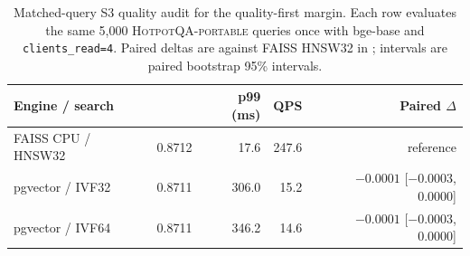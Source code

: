 \begin{table}[t]
\centering
\small
\setlength{\tabcolsep}{5pt}
\caption{Matched-query S3 quality audit for the quality-first margin. Each row evaluates the same 5{,}000 \textsc{HotpotQA-portable} queries once with bge-base and \texttt{clients\_read=4}. Paired deltas are against FAISS HNSW32 in \ecov{}; intervals are paired bootstrap 95\% intervals.}
\label{tab:s3-paired-quality}
\begin{tabular}{lrrrr}
\toprule
Engine / search & \ecov{} & p99 (ms) & QPS & Paired $\Delta$ \ecov{} \\
\midrule
FAISS CPU / HNSW32 & 0.8712 & 17.6 & 247.6 & reference \\
pgvector / IVF32 & 0.8711 & 306.0 & 15.2 & $-0.0001$ [$-0.0003$, 0.0000] \\
pgvector / IVF64 & 0.8711 & 346.2 & 14.6 & $-0.0001$ [$-0.0003$, 0.0000] \\
\bottomrule
\end{tabular}
\end{table}
